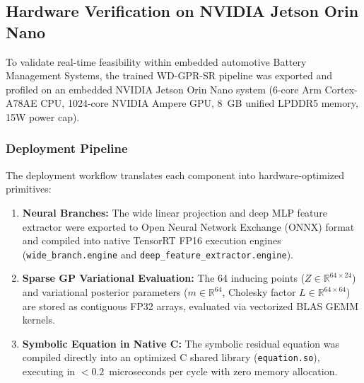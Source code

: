 \documentclass[a4paper,fleqn]{cas-sc}
\begin{document}
\subsection{Hardware Verification on NVIDIA Jetson Orin Nano}
To validate real-time feasibility within embedded automotive Battery Management Systems, the trained WD-GPR-SR pipeline was exported and profiled on an embedded NVIDIA Jetson Orin Nano system (6-core Arm Cortex-A78AE CPU, 1024-core NVIDIA Ampere GPU, 8~GB unified LPDDR5 memory, 15W power cap).

\subsubsection{Deployment Pipeline}
The deployment workflow translates each component into hardware-optimized primitives:
\begin{enumerate}
    \item \textbf{Neural Branches:} The wide linear projection and deep MLP feature extractor were exported to Open Neural Network Exchange (ONNX) format and compiled into native TensorRT FP16 execution engines (\texttt{wide\_branch.engine} and \texttt{deep\_feature\_extractor.engine}).
    \item \textbf{Sparse GP Variational Evaluation:} The 64 inducing points ($Z \in \mathbb{R}^{64 \times 24}$) and variational posterior parameters ($m \in \mathbb{R}^{64}$, Cholesky factor $L \in \mathbb{R}^{64 \times 64}$) are stored as contiguous FP32 arrays, evaluated via vectorized BLAS GEMM kernels.
    \item \textbf{Symbolic Equation in Native C:} The symbolic residual equation was compiled directly into an optimized C shared library (\texttt{equation.so}), executing in $<0.2$~microseconds per cycle with zero memory allocation.
\end{enumerate}
\end{document}
